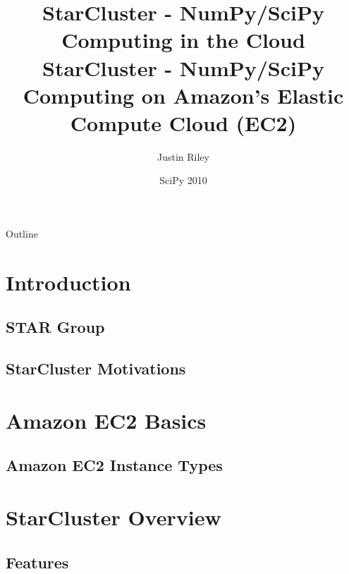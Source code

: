 \documentclass[english,compress]{beamer}
\title[StarCluster] 
{%
  StarCluster - NumPy/SciPy Computing in the Cloud%
}
\title{StarCluster - NumPy/SciPy Computing on Amazon's Elastic Compute Cloud (EC2)}
\author{Justin Riley}
\institute[Massachusetts Institute of Technology] %
{
  Software Tools for Academics and Researchers\\
  Office of Educational Innovation and Technology\\
  Massachusetts Institute of Technology}
\date[SciPy 2010]{SciPy 2010}
\begin{document}

\frame{\titlepage}

\section[Outline]{}
\begin{frame}{Outline}
  \tableofcontents
\end{frame}

\section{Introduction}
\subsection{STAR Group}

\subsection{StarCluster Motivations}



\section{Amazon EC2 Basics}
\subsection{Amazon EC2 Instance Types}



\questionframe{}

\section{StarCluster Overview}
\subsection{Features}





\end{document}
